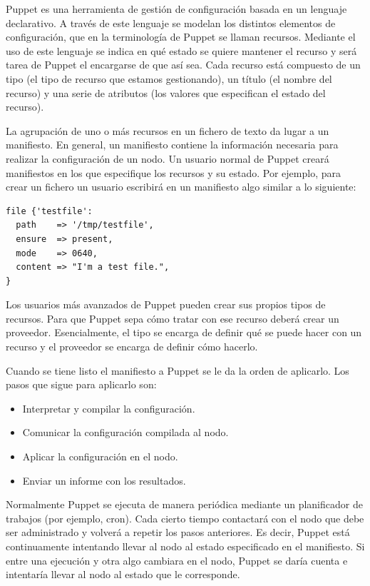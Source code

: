 Puppet es una herramienta de gestión de configuración basada en un lenguaje declarativo. A través de este lenguaje se modelan los distintos elementos de configuración, que en la terminología de Puppet se llaman recursos. Mediante el uso de este lenguaje se indica en qué estado se quiere mantener el recurso y será tarea de Puppet el encargarse de que así sea. Cada recurso está compuesto de un tipo (el tipo de recurso que estamos gestionando), un título (el nombre del recurso) y una serie de atributos (los valores que especifican el estado del recurso). 

La agrupación de uno o más recursos en un fichero de texto da lugar a un manifiesto. En general, un manifiesto contiene la información necesaria para realizar la configuración de un nodo. Un usuario normal de Puppet creará manifiestos en los que especifique los recursos y su estado. Por ejemplo, para crear un fichero un usuario escribirá en un manifiesto algo similar a lo siguiente:

\begin{lstlisting}
file {'testfile':
  path    => '/tmp/testfile',
  ensure  => present,
  mode    => 0640,
  content => "I'm a test file.",
}
\end{lstlisting}

Los usuarios más avanzados de Puppet pueden crear sus propios tipos de recursos. Para que Puppet sepa cómo tratar con ese recurso deberá crear un proveedor. Esencialmente, el tipo se encarga de definir qué se puede hacer con un recurso y el proveedor se encarga de definir cómo hacerlo.

Cuando se tiene listo el manifiesto a Puppet se le da la orden de aplicarlo. Los pasos que sigue para aplicarlo son:

\begin{itemize}
\item Interpretar y compilar la configuración.
\item Comunicar la configuración compilada al nodo.
\item Aplicar la configuración en el nodo.
\item Enviar un informe con los resultados.
\end{itemize}


Normalmente Puppet se ejecuta de manera periódica mediante un planificador de trabajos (por ejemplo, cron). Cada cierto tiempo contactará con el nodo que debe ser administrado y volverá a repetir los pasos anteriores. Es decir, Puppet está continuamente intentando llevar al nodo al estado especificado en el manifiesto. Si entre una ejecución y otra algo cambiara en el nodo, Puppet se daría cuenta e intentaría llevar al nodo al estado que le corresponde. \\

